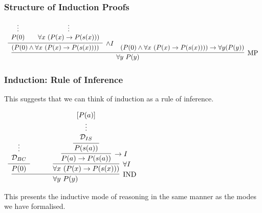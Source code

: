 \documentclass{beamer}
\theoremstyle{indentDefn} \newtheorem{defn}[]{Definition}
\begin{document}
\begin{frame}
	\frametitle{Structure of Induction Proofs}

	\begin{scriptsize}
			$\begin{array}{c}
				\infer[\MP]{\forall y \ P(y)}
					{\infer[\land I]{(P(0) \land \forall x \ (P(x) \to P(s(x))))}
						{\begin{array}{c} \vdots \\ P(0) \end{array}
						&
						\begin{array}{c} \vdots \\ \forall x \ (P(x) \to P(s(x))) \end{array}}
					&
					(P(0) \land \forall x \ (P(x) \to P(s(x)))) \rightarrow \forall y (P(y))}
			\end{array}$
	\end{scriptsize}

\end{frame}

\begin{frame}
	\frametitle{Induction: Rule of Inference}

	This suggests that we can think of induction as a rule of inference.

	\vspace{2mm}

		\begin{center}
			$\begin{array}{c}
				\infer[\IND]{\forall y \ P(y)}
						{\infer[]{P(0)}{\begin{array}{c} \vdots \\ \mathcal{D}_{BC}\end{array}} \hspace{3mm}
						&
						\hspace{3mm}
						\infer[\forall I]{\forall x \ (P(x) \to P(s(x)))}
							{\infer[\to I]{P(a) \to P(s(a))}
								{\infer[]{P(s(a))}
									{\begin{array}{c} [P(a)] \\ \vdots \\ \mathcal{D}_{IS} \end{array}}}}}
			\end{array}$
		\end{center}

	\vspace{2mm}

	This presents the inductive mode of reasoning in the same manner as the modes we have formalised.
\end{frame}
\end{document}
